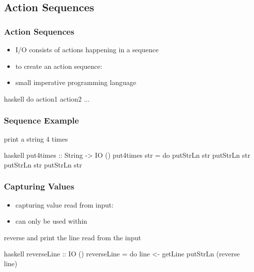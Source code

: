 \documentclass[dvipsnames]{beamer}
\theoremstyle{plain}
\begin{document}
\subsection{Action Sequences}

\begin{frame}[fragile]
  \frametitle{Action Sequences}

  \begin{itemize}
    \item I/O consists of \alert{actions} happening in a sequence
    \item to create an action sequence: 
    \item small imperative programming language
  \end{itemize}

  \begin{block}{}
    \begin{pygments}{haskell}
do action1
   action2
   ...
    \end{pygments}
  \end{block}
\end{frame}

\begin{frame}[fragile]
  \frametitle{Sequence Example}

  \begin{exampleblock}{print a string 4 times}
    \begin{pygments}{haskell}
put4times :: String -> IO ()
put4times str = do putStrLn str
                   putStrLn str
                   putStrLn str
                   putStrLn str
    \end{pygments}
  \end{exampleblock}
\end{frame}

\begin{frame}[fragile]
  \frametitle{Capturing Values}

  \begin{itemize}
    \item capturing value read from input: 
    \item can only be used within 
  \end{itemize}

  \begin{exampleblock}{reverse and print the line read from the input}
    \begin{pygments}{haskell}
reverseLine :: IO ()
reverseLine = do line <- getLine
                 putStrLn (reverse line)
    \end{pygments}
  \end{exampleblock}
\end{frame}
\end{document}

